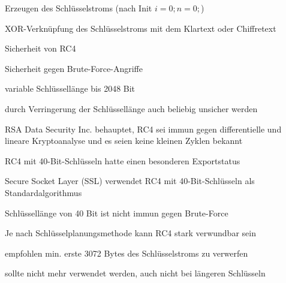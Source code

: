\documentclass[a4paper]{article}
\begin{document}
\begin{multicols}{3}
\begin{itemize*}
\begin{enumerate*}
                  \item Erzeugen des Schlüsselstroms (nach Init $i=0;n=0;$)
                  \item XOR-Verknüpfung des Schlüsselstroms mit dem Klartext oder Chiffretext
            \end{enumerate*}
            \item Sicherheit von RC4
            \begin{itemize*}
                  \item Sicherheit gegen Brute-Force-Angriffe
                  \item variable Schlüssellänge bis 2048 Bit
                  \item durch Verringerung der Schlüssellänge auch beliebig unsicher werden
                  \item RSA Data Security Inc. behauptet, RC4 sei immun gegen differentielle und lineare Kryptoanalyse und es seien keine kleinen Zyklen bekannt
            \end{itemize*}
            \item RC4 mit 40-Bit-Schlüsseln hatte einen besonderen Exportstatus%
            \begin{itemize*}
                  \item Secure Socket Layer (SSL) verwendet RC4 mit 40-Bit-Schlüsseln als Standardalgorithmus
                  \item Schlüssellänge von 40 Bit ist nicht immun gegen Brute-Force
            \end{itemize*}
            \item Je nach Schlüsselplanungsmethode kann RC4 stark verwundbar sein
            \item empfohlen min. erste 3072 Bytes des Schlüsselstroms zu verwerfen
            \item sollte nicht mehr verwendet werden, auch nicht bei längeren Schlüsseln
      \end{itemize*}


\end{multicols}
\end{document}
